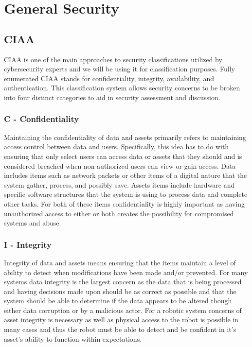 
\section{General Security}
\subsection{CIAA}  
CIAA is one of the main approaches to security classifications utilized by cybersecurity experts and we will be using it for classification purposes. Fully enumerated CIAA stands for confidentiality, integrity, availability, and authentication. This classification system allows security concerns to be broken into four distinct categories to aid in security assessment and discussion. 

\subsubsection{C - Confidentiality}


Maintaining the confidentiality of data and assets primarily refers to maintaining access control between data and users. Specifically, this idea has to do with ensuring that only select users can access data or assets that they should and is considered breached when non-authorized users can view or gain access. Data includes items such as network packets or other items of a digital nature that the system gather, process, and possibly save. Assets items include hardware and specific software structures that the system is using to process data and complete other tasks. For both of these items confidentiality is highly important as having unauthorized access to either or both creates the possibility for compromised systems and abuse. 

\subsubsection{I - Integrity}

Integrity of data and assets means ensuring that the items maintain a level of ability to detect when modifications have been made and/or prevented. For many systems data integrity is the largest concern as the data that is being processed and having decisions made upon should be as correct as possible and that the system should be able to determine if the data appears to be altered though either data corruption or by a malicious actor. For a robotic system concerns of asset integrity is necessary as well as physical access to the robot is possible in many cases and thus the robot must be able to detect and be confident in it's asset's ability to function within expectations.

